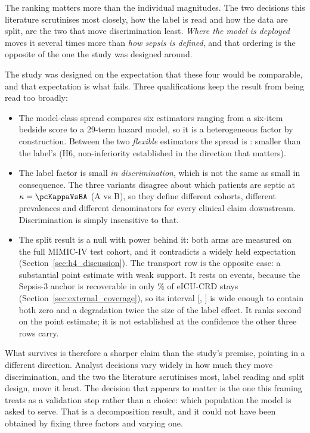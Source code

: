 The ranking matters more than the individual magnitudes. The two decisions this
literature scrutinises most closely, how the label is read and how the data are
split, are the two that move discrimination least. \emph{Where the model is
deployed} moves it several times more than \emph{how sepsis is defined}, and
that ordering is the opposite of the one the study was designed around.

The study was designed on the expectation that these four would be comparable,
and that expectation is what fails. Three qualifications keep the result from
being read too broadly:

\begin{itemize}
    \item The model-class spread compares six estimators ranging from a
          six-item bedside score to a 29-term hazard model, so it is a
          heterogeneous factor by construction. Between the two \emph{flexible}
          estimators the spread is \pcHSixEst{}: smaller than the label's
          (H6, non-inferiority established in the direction that matters).
    \item The label factor is small \emph{in discrimination}, which is not the
          same as small in consequence. The three variants disagree about which
          patients are septic at $\kappa = \pcKappaVsBA$ (A vs B), so they
          define different cohorts, different prevalences and different
          denominators for every clinical claim downstream. Discrimination is
          simply insensitive to that.
    \item The split result is a null with power behind it: both arms are
          measured on the full MIMIC-IV test cohort, and it contradicts a
          widely held expectation (Section~\ref{sec:h4_discussion}). The
          transport row is the opposite case: a substantial point estimate
          with weak support. It rests on \pcExtNEventsB{} events, because the
          Sepsis-3 anchor is recoverable in only \pcExtMicroCoverage\% of
          eICU-CRD stays (Section~\ref{sec:external_coverage}), so its interval
          [\pcHFiveCiLo, \pcHFiveCiHi] is wide enough to contain both zero and
          a degradation twice the size of the label effect. It ranks second on
          the point estimate; it is not established at the confidence the other
          three rows carry.
\end{itemize}

What survives is therefore a sharper claim than the study's premise, pointing
in a different direction. Analyst decisions vary widely in how much they move
discrimination, and the two the literature scrutinises most, label reading
and split design, move it least. The decision that appears to matter is the
one this framing treats as a validation step rather than a choice: which
population the model is asked to serve. That is a decomposition result, and it
could not have been obtained by fixing three factors and varying one.

